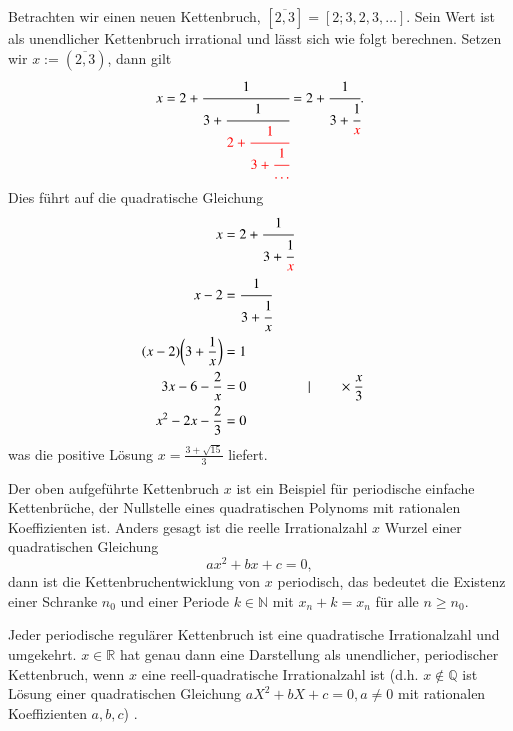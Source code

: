 \begin{beispiel}
Betrachten wir einen neuen Kettenbruch, $[\overline{2,3}] =  [2;3,2,3,\dots]$.
Sein Wert ist als unendlicher Kettenbruch irrational und lässt sich
wie folgt berechnen. Setzen wir $x:=(\overline{2,3})$, dann gilt
\begin{equation}
x
=
2 + \cfrac{1}{3+\cfrac{1}{\color{red}2+\cfrac{1}{3+\cfrac{1}{\dots}}}}
=
2 + \cfrac{1}{3+\cfrac{1}{\color{red}x}}.
\end{equation}
Dies führt auf die quadratische Gleichung 
\begin{align*}
x &= 2 + \cfrac{1}{3+\cfrac{1}{{\color{red}x}}}
\\
x - 2 &= \cfrac{1}{3+\cfrac{1}{x}}
\\
(x - 2)\biggl(3 + \frac{1}{x}\biggr) &= 1
\\
3x - 6 - \frac{2}{x} &= 0 &&\vert \qquad\times\frac{x}{3}
\\
x^2 - 2x - \frac{2}{3} &= 0
\end{align*}
was die positive Lösung $x = \displaystyle \frac{3+\sqrt{15}}{3}$ liefert.
\end{beispiel}
Der oben aufgeführte Kettenbruch $x$ ist ein Beispiel für periodische
einfache Kettenbrüche, der Nullstelle eines quadratischen Polynoms
mit rationalen Koeffizienten ist. Anders gesagt ist die reelle
Irrationalzahl $x$ Wurzel einer quadratischen Gleichung
\begin{equation}
ax^2 + bx + c = 0,
\end{equation}
dann ist die Kettenbruchentwicklung von $x$ periodisch, das bedeutet
die Existenz einer Schranke $n_0$ und einer Periode $k \in \mathbb{N}$
mit $x_n+k = x_n$ für alle $n\ge n_0$.

\begin{satz}
Jeder periodische regulärer Kettenbruch ist eine quadratische
Irrationalzahl und umgekehrt. $x \in \mathbb{R}$ hat genau dann eine 
Darstellung als unendlicher, periodischer Kettenbruch, wenn $x$ eine
reell-quadratische Irrationalzahl ist (d.h. $x \notin \mathbb{Q}$ ist Lösung
einer quadratischen Gleichung $aX^2 + bX + c = 0, a \neq 0$ mit rationalen 
Koeffizienten $a,b,c$) \cite{kettenbruch:perron}.
\end{satz}
%

